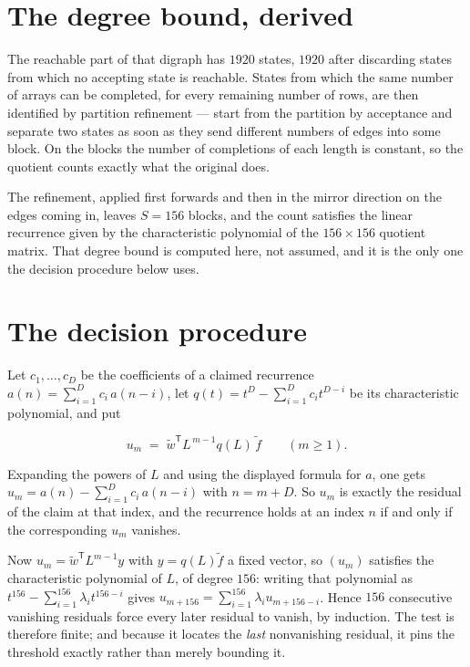 \documentclass[11pt]{article}
\theoremstyle{definition}
\begin{document}
\section{The degree bound, derived}

The reachable part of that digraph has $1920$ states, $1920$ after discarding states from which no accepting state is reachable. States from which the same number of arrays can be completed, for every remaining number of rows, are then identified by partition refinement --- start from the partition by acceptance and separate two states as soon as they send different numbers of edges into some block. On the blocks the number of completions of each length is constant, so the quotient counts exactly what the original does.

The refinement, applied first forwards and then in the mirror direction on the edges coming in, leaves $S = 156$ blocks, and the count satisfies the linear recurrence given by the characteristic polynomial of the $156 \times 156$ quotient matrix. That degree bound is computed here, not assumed, and it is the only one the decision procedure below uses.

\section{The decision procedure}

Let $c_1,\dots,c_D$ be the coefficients of a claimed recurrence $a(n) = \sum_{i=1}^{D} c_i\,a(n-i)$, let $q(t) = t^{D} - \sum_{i=1}^{D} c_i t^{D-i}$ be its characteristic polynomial, and put

\[u_m \;=\; \tilde w^{\mathsf T} L^{\,m-1} q(L)\,\tilde f \qquad (m \ge 1).\]

Expanding the powers of $L$ and using the displayed formula for $a$, one gets $u_m = a(n) - \sum_{i=1}^{D} c_i\,a(n-i)$ with $n = m + D$. So $u_m$ is exactly the residual of the claim at that index, and the recurrence holds at an index $n$ if and only if the corresponding $u_m$ vanishes.

Now $u_m = \tilde w^{\mathsf T} L^{m-1} y$ with $y = q(L)\tilde f$ a fixed vector, so $(u_m)$ satisfies the characteristic polynomial of $L$, of degree $156$: writing that polynomial as $t^{156} - \sum_{i=1}^{156} \lambda_i t^{156-i}$ gives $u_{m+156} = \sum_{i=1}^{156} \lambda_i u_{m+156-i}$. Hence $156$ consecutive vanishing residuals force every later residual to vanish, by induction. The test is therefore finite; and because it locates the {\itshape last} nonvanishing residual, it pins the threshold exactly rather than merely bounding it.
\end{document}
